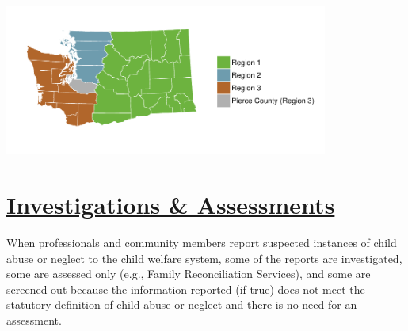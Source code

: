 \documentclass{article}\usepackage{graphicx, color}
\begin{document}
\begin{center}
\includegraphics[height=1.95in]{county_maps/Pierce}
\end{center}
\newpage
\section{\href{http://www.partnersforourchildren.org//child-well-being/visualizations/investigations-assessments/trends}
{Investigations \& Assessments}}
When professionals and community members report suspected instances of child abuse or neglect to the child welfare system, some of the reports are investigated, some are assessed only (e.g., Family Reconciliation Services), and some are screened out because the information reported (if true) does not meet the statutory definition of child abuse or neglect and there is no need for an assessment.
\end{document}
